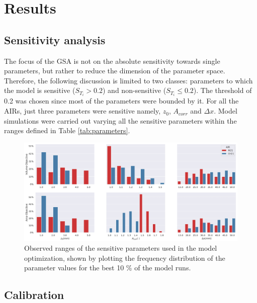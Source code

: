 \documentclass[utf8]{frontiersSCNS}
\begin{document}
\section{Results}

\subsection{Sensitivity analysis}

The focus of the GSA is not on the absolute sensitivity towards single parameters, but rather to reduce the
dimension of the parameter space. Therefore, the following discussion is limited to two classes: parameters to
which the model is sensitive ($S_{T_{i}} > 0.2$) and non-sensitive ($S_{T_{i}} \leq 0.2$). The threshold of 0.2 was
chosen since most of the parameters were bounded by it. For all the AIRs, just three parameters were sensitive
namely, $z_{0}$, $A_{corr}$ and $\Delta x$. Model simulations were carried out varying all the sensitive parameters
within the ranges defined in Table \ref{tab:parameters}.

\begin{figure}
	\begin{center}
		\includegraphics[width=\linewidth]{Figures/param_hist.jpg}
	\end{center}
	\caption{Observed ranges of the sensitive parameters used in the model optimization, shown by
		plotting the frequency distribution of the parameter values for the best 10 \% of the model runs. }
	\label{fig:param_hist}
\end{figure}

\subsection{Calibration}
\end{document}
